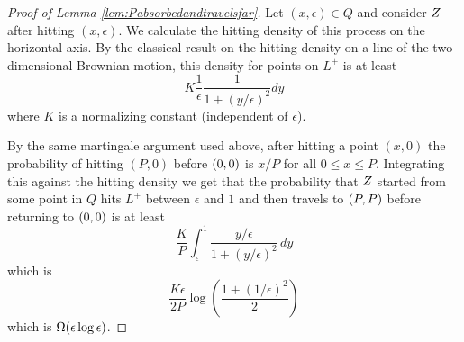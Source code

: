 {\begin{proof}[Proof of Lemma \ref{lem:Pabsorbedandtravelsfar}]
Let $(x,\epsilon)\in Q$ and consider $Z$ after hitting $(x,\epsilon)$.
We calculate the hitting density of this process on the horizontal axis.
By the classical result on the hitting density on a line of the two-dimensional
Brownian motion, this density for points on $L^+$ is at least
\[
K\frac{1}{\epsilon} \frac{1}{1 + (y/\epsilon)^2} dy
\]
where $K$ is a normalizing constant (independent of $\epsilon$).

By the same martingale argument used above, after hitting a point $(x,0)$ the
probability of hitting $(P,0)$ before $(0,0)$ is $x/P$ for all $0\le x\le P$.
Integrating this against the hitting density we get that the probability that
$Z$ started from some point in $Q$ hits $L^+$
between $\epsilon$ and $1$ and then travels to $(P,P)$ before returning
to $(0,0)$ is at least
\[
\frac{K}{P} \int_{\epsilon}^{1} \frac{y/\epsilon}{1 + (y/\epsilon)^2}
\, dy
\]
which is
\[
\frac{K\epsilon}{2P} \log\left(\frac{1 + (1/\epsilon)^2}{2}\right)
\]
which is $\Omega(\epsilon\log\epsilon)$.
\end{proof}
}
